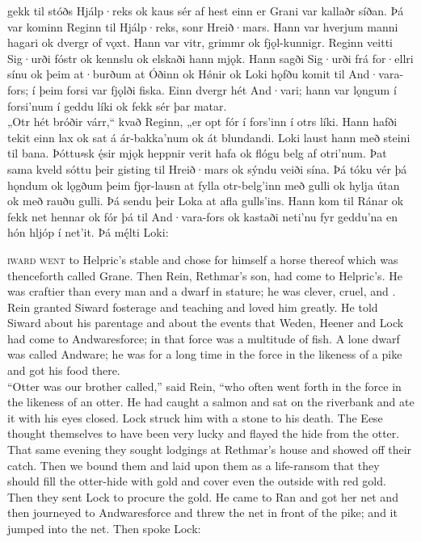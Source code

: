\bpg\bpa%
 gekk til stóðs Hjálp·reks ok kaus sér af hest einn er Grani var kallaðr síðan. Þá var kominn Reginn til Hjálp·reks, sonr Hreið·mars. Hann var hverjum manni hagari ok dvergr of vǫxt. Hann var vitr, grimmr ok fjǫl-kunnigr. Reginn veitti Sig·urði fóstr ok kennslu ok elskaði hann mjǫk. Hann sagði Sig·urði frá for·ellri sínu ok þeim at·burðum at Óðinn ok Hǿnir ok Loki hǫfðu komit til And·vara-fors; í þeim forsi var fjǫlði fiska. Einn dvergr hét And·vari; hann var lǫngum í forsi’num í geddu líki ok fekk sér þar matar. \\
„Otr hét bróðir várr,“ kvað Reginn, „er opt fór í fors’inn í otrs líki. Hann hafði tekit einn lax ok sat á ár-bakka’num ok át blundandi. Loki laust hann með steini til bana. Þóttu⸗sk ę́sir mjǫk heppnir verit hafa ok flógu belg af otri’num. Þat sama kveld sóttu þeir gisting til Hreið·mars ok sýndu veiði sína. Þá tóku vér þá hǫndum ok lǫgðum þeim fjǫr-lausn at fylla otr-belg’inn með gulli ok hylja útan ok með rauðu gulli. Þá sendu þeir Loka at afla gulls’ins. Hann kom til Ránar ok fekk net hennar ok fór þá til And·vara-fors ok kastaði neti’nu fyr geddu’na en hón hljóp í net’it. Þá mę́lti Loki:\epa

\textsc{iward went} to Helpric’s stable and chose for himself a horse thereof which was thenceforth called Grane.  Then Rein, Rethmar’s son, had come to Helpric’s.  He was craftier than every man and a dwarf in stature; he was clever, cruel, and .  Rein granted Siward fosterage and teaching and loved him greatly.  He told Siward about his parentage and about the events that Weden, Heener and Lock had come to Andwaresforce; in that force was a multitude of fish.  A lone dwarf was called Andware; he was for a long time in the force in the likeness of a pike and got his food there. \\
“Otter was our brother called,” said Rein, “who often went forth in the force in the likeness of an otter.  He had caught a salmon and sat on the riverbank and ate it with his eyes closed.  Lock struck him with a stone to his death.  The Eese thought themselves to have been very lucky and flayed the hide from the otter.  That same evening they sought lodgings at Rethmar’s house and showed off their catch.  Then we bound them and laid upon them as a life-ransom that they should fill the otter-hide with gold and cover even the outside with red gold.  Then they sent Lock to procure the gold.  He came to Ran and got her net and then journeyed to Andwaresforce and threw the net in front of the pike; and it jumped into the net.  Then spoke Lock:\epb\epg


